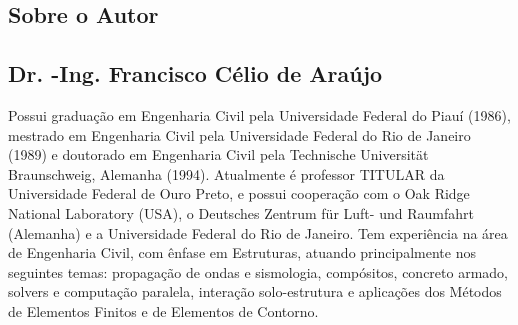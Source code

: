 \begin{frontmatter}
	\chapter*{Sobre o Autor}
\end{frontmatter}

\begin{biography}
	\section*{Dr. -Ing. Francisco Célio de Araújo}

	Possui graduação em Engenharia Civil pela Universidade Federal do Piauí (1986), mestrado em Engenharia Civil pela Universidade Federal do Rio de Janeiro (1989) e doutorado em Engenharia Civil pela Technische Universität Braunschweig, Alemanha (1994). Atualmente é professor TITULAR da Universidade Federal de Ouro Preto, e possui cooperação com o Oak Ridge National Laboratory (USA), o Deutsches Zentrum für Luft- und Raumfahrt (Alemanha) e a Universidade Federal do Rio de Janeiro. Tem experiência na área de Engenharia Civil, com ênfase em Estruturas, atuando principalmente nos seguintes temas: propagação de ondas e sismologia, compósitos, concreto armado, solvers e computação paralela, interação solo-estrutura e aplicações dos Métodos de Elementos Finitos e de Elementos de Contorno.
\end{biography}
